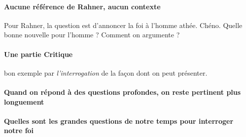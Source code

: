 \paragraph{Aucune référence de Rahner, aucun contexte} Pour Rahner, la question est d'annoncer la foi à l'homme athée. Chéno. Quelle bonne nouvelle pour l'homme ? Comment on argumente ? 

\paragraph{Une partie Critique} bon exemple par \textit{l'interrogation} de la façon dont on peut présenter. 

\paragraph{Quand on répond à des questions profondes, on reste pertinent plus longuement}

\paragraph{Quelles sont les grandes questions de notre temps pour interroger notre foi}